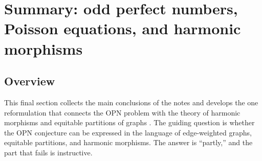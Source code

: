 \documentclass[11pt]{article}
\theoremstyle{definition}
\theoremstyle{remark}
\begin{document}
\section{Summary: odd perfect numbers, Poisson equations, and harmonic morphisms}\label{sec:summary}

\subsection{Overview}

This final section collects the main conclusions of the notes and develops
the one reformulation that connects the OPN problem with the theory of
harmonic morphisms and equitable partitions of graphs
\cite{JM2017, MJ2026, MJappl}.  The guiding question is whether the OPN
conjecture can be expressed in the language of edge-weighted graphs,
equitable partitions, and harmonic morphisms.  The answer is ``partly,'' and
the part that fails is instructive.
\end{document}
